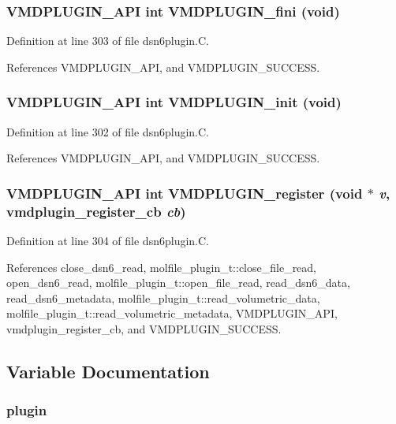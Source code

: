 \subsubsection{\setlength{\rightskip}{0pt plus 5cm}VMDPLUGIN\_\-API int VMDPLUGIN\_\-fini (void)}\label{dsn6plugin_8C_a7}




Definition at line 303 of file dsn6plugin.C.

References VMDPLUGIN\_\-API, and VMDPLUGIN\_\-SUCCESS.
\subsubsection{\setlength{\rightskip}{0pt plus 5cm}VMDPLUGIN\_\-API int VMDPLUGIN\_\-init (void)}\label{dsn6plugin_8C_a6}




Definition at line 302 of file dsn6plugin.C.

References VMDPLUGIN\_\-API, and VMDPLUGIN\_\-SUCCESS.
\subsubsection{\setlength{\rightskip}{0pt plus 5cm}VMDPLUGIN\_\-API int VMDPLUGIN\_\-register (void $\ast$ {\em v}, {\bf vmdplugin\_\-register\_\-cb} {\em cb})}\label{dsn6plugin_8C_a8}




Definition at line 304 of file dsn6plugin.C.

References close\_\-dsn6\_\-read, molfile\_\-plugin\_\-t::close\_\-file\_\-read, open\_\-dsn6\_\-read, molfile\_\-plugin\_\-t::open\_\-file\_\-read, read\_\-dsn6\_\-data, read\_\-dsn6\_\-metadata, molfile\_\-plugin\_\-t::read\_\-volumetric\_\-data, molfile\_\-plugin\_\-t::read\_\-volumetric\_\-metadata, VMDPLUGIN\_\-API, vmdplugin\_\-register\_\-cb, and VMDPLUGIN\_\-SUCCESS.

\subsection{Variable Documentation}
\subsubsection{ plugin\hspace{0.3cm}{\tt  [static]}}\label{dsn6plugin_8C_a1}


